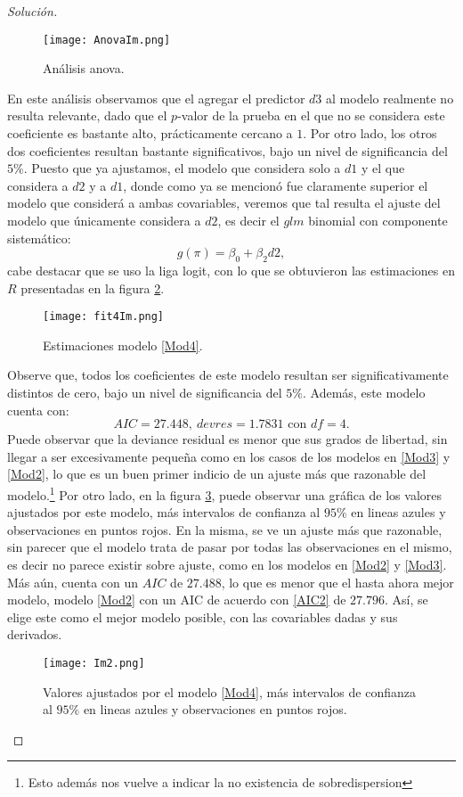 \documentclass[10.5pt,notitlepage]{article}
\newenvironment{solucion}
  {\begin{proof}[Solución]}
  {\end{proof}}
\theoremstyle{plain}
\begin{document}
\begin{solucion}
\begin{figure}[htb]
    \centering
    \texttt{[image: AnovaIm.png]}
    \caption{Análisis anova.}
    \label{figtodas}
\end{figure}
En este análisis observamos que el agregar el predictor \(d3\) al modelo realmente no resulta relevante, dado que el \(p\)-valor de la prueba en el que no se considera este coeficiente es bastante alto, prácticamente cercano a \(1\). Por otro lado, los otros dos coeficientes resultan bastante significativos, bajo un nivel de significancia del \(5\%\). Puesto que ya ajustamos, el modelo que considera solo a \(d1\) y el que considera a \(d2\) y a \(d1\), donde como ya se mencionó fue claramente superior el modelo que considerá a ambas covariables, veremos que tal resulta el ajuste del modelo que únicamente considera a \(d2\), es decir el \(glm\) binomial con componente sistemático: 
\begin{equation}\label{Mod4}
    g(\pi) = \beta_0 +\beta_2 d2,
\end{equation}
cabe destacar que se uso la liga logit, con lo que se obtuvieron las estimaciones en \(R\) presentadas en la figura \ref{fig4}.
\begin{figure}[htb]
    \centering
    \texttt{[image: fit4Im.png]}
    \caption{Estimaciones modelo \eqref{Mod4}.}
    \label{fig4}
\end{figure}
Observe que, todos los coeficientes de este modelo resultan ser significativamente distintos de cero, bajo un nivel de significancia del \(5\%\). Además, este modelo cuenta con:
\begin{equation}\label{AIC4}
    AIC = 27.448, \ devres = 1.7831 \text{ con } df = 4.  
\end{equation}
Puede observar que la deviance residual es menor que sus grados de libertad, sin llegar a ser excesivamente pequeña como en los casos de los modelos en \eqref{Mod3} y \eqref{Mod2}, lo que es un buen primer indicio de un ajuste más que razonable del modelo.\footnote{Esto además nos vuelve a indicar la no existencia de sobredispersion}
Por otro lado, en la figura \ref{figtod}, puede observar  una gráfica de los valores ajustados por este modelo, más intervalos de confianza al \(95\%\) en lineas azules y observaciones en puntos rojos. En la misma, se ve un ajuste más que razonable, sin parecer que el modelo trata de pasar por todas las observaciones en el mismo, es decir no parece existir sobre ajuste, como en los modelos en \eqref{Mod2} y \eqref{Mod3}. Más aún, cuenta con un \(AIC\) de \(27.488\), lo que es menor que el hasta ahora mejor modelo, modelo \eqref{Mod2} con un AIC de acuerdo con \eqref{AIC2} de \(27.796\). Así, se elige este como el mejor modelo posible, con las covariables dadas y sus derivados. 
\begin{figure}[htb]
    \centering
    \texttt{[image: Im2.png]}
    \caption{Valores ajustados por el modelo \eqref{Mod4}, más intervalos de confianza al \(95\%\) en lineas azules y observaciones en puntos rojos.}
    \label{figtod}
\end{figure}
\end{solucion}
\end{document}
